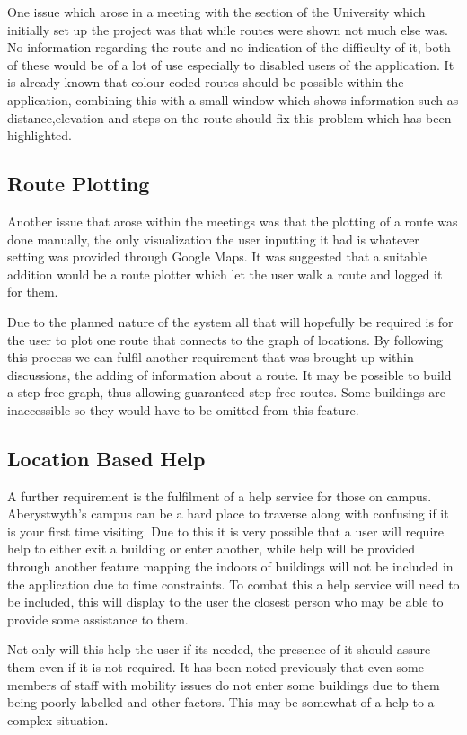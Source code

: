 One issue which arose in a meeting with the section of the University which initially set up the project was that while routes were shown not much else was. No information regarding the route and no indication of the difficulty of it, both of these would be of a lot of use especially to disabled users of the application. It is already known that colour coded routes should be possible within the application, combining this with a small window which shows information such as distance,elevation and steps on the route should fix this problem which has been highlighted. 
\subsection{Route Plotting}
Another issue that arose within the meetings was that the plotting of a route was done manually, the only visualization the user inputting it had is whatever setting was provided through Google Maps. It was suggested that a suitable addition would be a route plotter which let the user walk a route and logged it for them. 

Due to the planned nature of the system all that will hopefully be required is for the user to plot one route that connects to the graph of locations. By following this process we can fulfil another requirement that was brought up within discussions, the adding of information about a route. It may be possible to build a step free graph, thus allowing guaranteed step free routes. Some buildings are inaccessible so they would have to be omitted from this feature. 
\subsection{Location Based Help}
A further requirement is the fulfilment of a help service for those on campus. Aberystwyth's campus can be a hard place to traverse along with confusing if it is your first time visiting. Due to this it is very possible that a user will require help to either exit a building or enter another, while help will be provided through another feature mapping the indoors of buildings will not be included in the application due to time constraints. To combat this a help service will need to be included, this will display to the user the closest person who may be able to provide some assistance to them.

Not only will this help the user if its needed, the presence of it should assure them even if it is not required. It has been noted previously that even some members of staff with mobility issues do not enter some buildings due to them being poorly labelled and other factors. This may be somewhat of a help to a complex situation.
